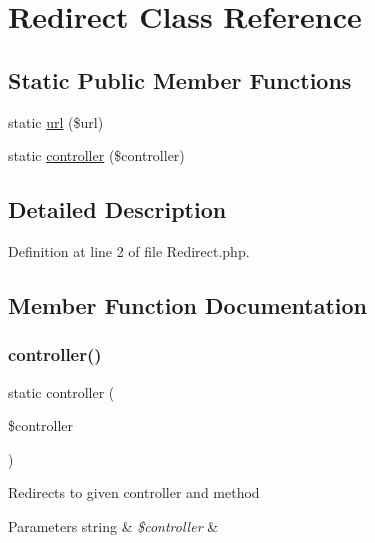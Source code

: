 \hypertarget{class_redirect}{}\section{Redirect Class Reference}
\label{class_redirect}
\subsection*{Static Public Member Functions}
\begin{DoxyCompactItemize}
\item 
static \hyperlink{class_redirect_a8c51feb32df9ae35002451714b7a9a73}{url} (\$url)
\item 
static \hyperlink{class_redirect_ab7d0d268b6aaa9a5470b7cb8c7eb1b61}{controller} (\$controller)
\end{DoxyCompactItemize}


\subsection{Detailed Description}


Definition at line 2 of file Redirect.\+php.



\subsection{Member Function Documentation}
\hypertarget{class_redirect_ab7d0d268b6aaa9a5470b7cb8c7eb1b61}{}\label{class_redirect_ab7d0d268b6aaa9a5470b7cb8c7eb1b61} 
\subsubsection{\texorpdfstring{controller()}{controller()}}
{\footnotesize\ttfamily static controller (\begin{DoxyParamCaption}\item[{}]{\$controller }\end{DoxyParamCaption})\hspace{0.3cm}{\ttfamily [static]}}

Redirects to given controller and method


\begin{DoxyParams}[1]{Parameters}
string & {\em \$controller} & \\
\hline
\end{DoxyParams}


